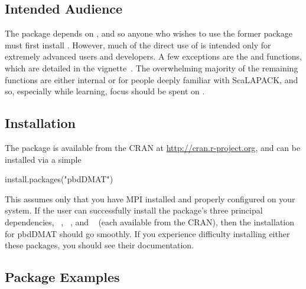 \subsection{Intended Audience}
\label{sec:more_examples}

The  package depends on , and so anyone who wishes to use the former package must first install .  However, much of the direct use of  is intended only for extremely advanced users and developers.  A few exceptions are the  and  functions, which are detailed in the  vignette~\citep{Schmidt2012pbdBASEvignette}.  The overwhelming majority of the remaining functions are either internal or for people deeply familiar with ScaLAPACK, and so, especially while learning, focus should be spent on .






\subsection[]{Installation}
\label{sec:installation}

The  package is available from the CRAN at
\url{http://cran.r-project.org}, and can be installed via a simple 
\begin{Code}
install.packages("pbdDMAT")
\end{Code}
This assumes only that you have MPI installed and properly configured on your system.  If the user can successfully install the package's three principal dependencies, ~\citep{Chen2012pbdMPIpackage}, ~\citep{Chen2012pbdSLAPpackage}, and ~\citep{Schmidt2012pbdBASEpackage} (each available from the CRAN), then the installation for pbdDMAT should go smoothly.  If you experience difficulty installing either these packages, you should see their documentation.






\subsection[]{Package Examples}
\label{sec:more_examples}

